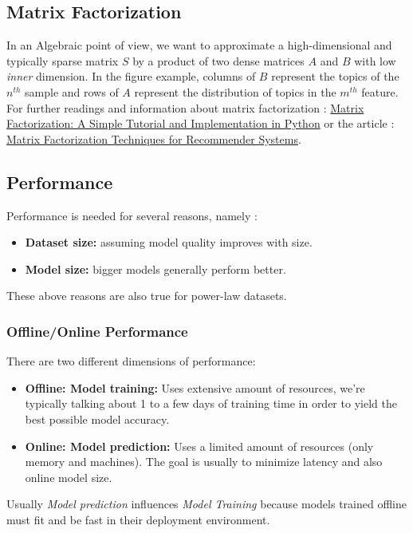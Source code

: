\subsection{Matrix Factorization}
In an Algebraic point of view, we want to approximate a high-dimensional and typically sparse matrix $S$ by a product of two dense matrices $A$ and $B$ with low \emph{inner} dimension. In the figure example, columns of $B$ represent the topics of the $n^{th}$ sample and rows of $A$ represent the distribution of topics in the $m^{th}$ feature. For further readings and information about matrix factorization : \href{http://www.quuxlabs.com/blog/2010/09/matrix-factorization-a-simple-tutorial-and-implementation-in-python/}{Matrix Factorization: A Simple Tutorial and Implementation in Python} or the article : \href{https://datajobs.com/data-science-repo/Recommender-Systems-[Netflix].pdf}{Matrix Factorization Techniques for Recommender Systems}.

\subsection{Performance}
Performance is needed for several reasons, namely :
\begin{itemize}
\item \textbf{Dataset size:} assuming model quality improves with size.
\item \textbf{Model size:} bigger models generally perform better.
\end{itemize}
These above reasons are also true for power-law datasets.

\subsubsection{Offline/Online Performance}
There are two different dimensions of performance:
\begin{itemize}
\item \textbf{Offline: Model training:} Uses extensive amount of resources, we're typically talking about 1 to a few days of training time in order to yield the best possible model accuracy.
\item \textbf{Online: Model prediction: }Uses a limited amount of resources (only memory and machines). The goal is usually to minimize latency and also online model size.
\end{itemize}
Usually \emph{Model prediction} influences \emph{Model Training} because models trained offline must fit and be fast in their deployment environment.

